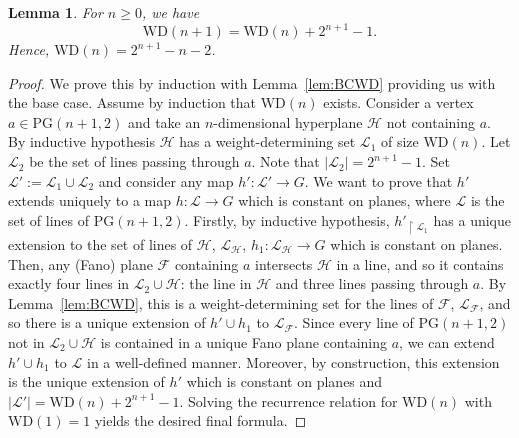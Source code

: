 \documentclass{article}
\newtheorem{lemma}[theorem]{Lemma}
\theoremstyle{remark}
\theoremstyle{definition}
\begin{document}
\begin{lemma}\label{lem:WDformula} For $n\geq 0$, we have
\[\mathrm{WD}(n+1)=\mathrm{WD}(n)+2^{n+1}-1.\]
Hence, $\mathrm{WD}(n)=2^{n+1}-n-2$. 
\end{lemma}
\begin{proof} We prove this by induction with Lemma~\ref{lem:BCWD} providing us with the base case. Assume by induction that $\mathrm{WD}(n)$ exists. Consider a vertex $a\in\mathrm{PG}(n+1, 2)$ and take an $n$-dimensional hyperplane $\mathcal{H}$ not containing $a$. By inductive hypothesis $\mathcal{H}$ has a weight-determining set $\mathcal{L}_1$ of size $\mathrm{WD}(n)$. Let $\mathcal{L}_2$ be the set of lines passing through $a$. Note that $|\mathcal{L}_2|=2^{n+1}-1$. Set $\mathcal{L}':=\mathcal{L}_1\cup\mathcal{L}_2$ and consider any map $h':\mathcal{L}'\to G$. We want to prove that $h'$ extends uniquely to a map $h:\mathcal{L}\to G$ which is constant on planes, where $\mathcal{L}$ is the set of lines of $\mathrm{PG}(n+1, 2)$. Firstly, by inductive hypothesis, $h'_{\upharpoonright\mathcal{L}_1}$ has a unique extension to the set of lines of $\mathcal{H}$, $\mathcal{L}_\mathcal{H}$, $h_1:\mathcal{L}_\mathcal{H}\to G$ which is constant on planes. Then, any (Fano) plane $\mathcal{F}$ containing $a$ intersects $\mathcal{H}$ in a line, and so it contains exactly four lines in $\mathcal{L}_2\cup\mathcal{H}$: the line in $\mathcal{H}$ and three lines passing through $a$. By Lemma~\ref{lem:BCWD}, this is a weight-determining set for the lines of $\mathcal{F}$, $\mathcal{L}_\mathcal{F}$, and so there is a unique extension of $h'\cup h_1$ to $\mathcal{L}_\mathcal{F}$. Since every line of $\mathrm{PG}(n+1, 2)$ not in $\mathcal{L}_2\cup\mathcal{H}$ is contained in a unique Fano plane containing $a$, we can extend $h'\cup h_1$ to $\mathcal{L}$ in a well-defined manner. Moreover, by construction, this extension is the unique extension of $h'$ which is constant on planes and $|\mathcal{L}'|=\mathrm{WD}(n)+2^{n+1}-1$. Solving the recurrence relation for $\mathrm{WD}(n)$ with $\mathrm{WD}(1)=1$ yields the desired final formula.
\end{proof}
\end{document}
